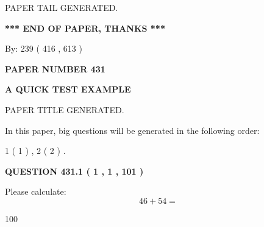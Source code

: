 \documentclass[12pt]{article}
\begin{document}
\vspace{2.0in} PAPER TAIL GENERATED.
   
   
   
   
\vspace{1.0in} 
{\textbf{\large{ *** END OF PAPER, THANKS *** }}} 
   
   
\hspace{1.0in} By: 
 239 ( 416 ,  613 )
   
   
   
   
\newpage 
\setcounter{page}{ 
   431001 } 
   
   
   
   
 {\textbf{ \Large{ PAPER NUMBER  431  }}}
   
   
\vspace{0.2in}
   
   
   
   
   
   
   
   
 \vspace{0.2in}
{\LARGE {\textbf{ A QUICK TEST EXAMPLE}}}
   
   
 PAPER TITLE GENERATED.
   
   
   
\vspace{0.2in}
   
In this paper, big questions will be generated in the following order: 
   
   
   1 ( 1 )
 ,
   2 ( 2 )
 .
  
\vspace{0.2in}
  
{\textbf{\Large{QUESTION
431.1 
 ( 1 , 1 , 101 )
}}}
  
  
 
Please calculate:
\begin{equation}
46 +  %
54 = \nonumber
\end{equation}
 
 
 
\noindent{}
 
 

100
 
 
\noindent{}
 
 

 
 
\end{document}
